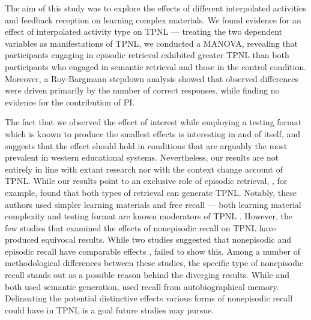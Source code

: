 \documentclass[../main.tex]{subfiles}
\begin{document}
The aim of this study was to explore the effects of different interpolated  
activities and feedback reception on learning complex materials. We found 
evidence for an effect of interpolated activity type on TPNL — treating the 
two dependent variables as manifestations of TPNL, we conducted a MANOVA, 
revealing that participants engaging in episodic retrieval exhibited greater 
TPNL than both participants who engaged in semantic retrieval and those in 
the control condition. Moreover, a Roy-Bargmann stepdown analysis showed 
that observed differences were driven primarily by the number of correct 
responses, while finding no evidence for the contribution of PI.

The fact that we observed the effect of interest while employing a testing 
format which is known to produce the smallest effects is interesting in and 
of itself, and suggests that the effect should hold in conditions that are 
arguably the most prevalent in western educational systems. Nevertheless, 
our results are not entirely in line with extant research nor with the 
context change account of TPNL. While our results point to an exclusive role 
of episodic retrieval, \cite{pastotterRetrievalLearningFacilitates2011}, for 
example, found that both types of retrieval can generate TPNL. Notably, 
these authors used simpler learning materials and free recall — both 
learning material complexity and testing format are known moderators of TPNL 
\citep{chanRetrievalPotentiatesNew2018}. However, the few studies that 
examined the effects of nonepisodic recall on TPNL have produced equivocal 
results. While two studies suggested that nonepisodic and episodic recall 
have comparable effects \citep{divisRetrievalSpeedsContext2014, 
pastotterRetrievalLearningFacilitates2011}, 
\cite{weinsteinNotAllRetrieval2015} failed to show this. Among a number of 
methodological differences between these studies, the specific type of 
nonepisodic recall stands out as a possible reason behind the diverging 
results. While \cite{pastotterRetrievalLearningFacilitates2011} and 
\cite{divisRetrievalSpeedsContext2014} both used semantic generation, 
\cite{weinsteinNotAllRetrieval2015} used recall from autobiographical 
memory. Delineating the potential distinctive effects various forms of 
nonepisodic recall could have in TPNL is a goal future 
studies may pursue.
\end{document}
